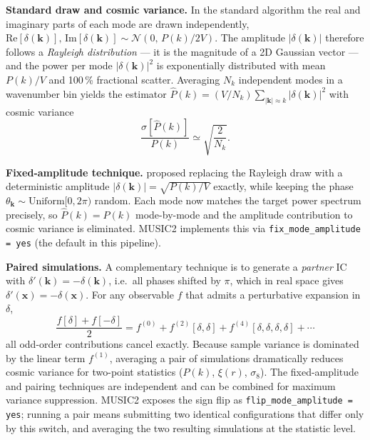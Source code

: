 \documentclass[12pt]{article}
\newcommand{\bx}{\mathbf{x}}
\newcommand{\bk}{\mathbf{k}}
\begin{document}
\begin{tcolorbox}[
  title={Fixed-amplitude (``paired-and-fixed'') ICs \citep{Angulo2016}},
  colback=gray!5,
  colframe=gray!55!black,
  coltitle=white,
  fonttitle=\bfseries,
  breakable,
  before skip=1.2em,
  after skip=1.2em
]

\textbf{Standard draw and cosmic variance.}
In the standard algorithm the real and imaginary parts of each mode are drawn
independently,
$\mathrm{Re}[\delta(\bk)],\,\mathrm{Im}[\delta(\bk)]
 \sim \mathcal{N}(0,\,P(k)/2V)$.
The amplitude $|\delta(\bk)|$ therefore follows a \emph{Rayleigh
distribution} — it is the magnitude of a 2D Gaussian vector — and the
power per mode $|\delta(\bk)|^2$ is exponentially distributed with mean
$P(k)/V$ and 100\,\% fractional scatter.
Averaging $N_k$ independent modes in a wavenumber bin yields the estimator
$\hat{P}(k) = (V/N_k)\sum_{|\bk|\approx k}|\delta(\bk)|^2$ with cosmic
variance
%
\begin{equation*}
  \frac{\sigma[\hat{P}(k)]}{P(k)} \simeq \sqrt{\frac{2}{N_k}}.
\end{equation*}

\textbf{Fixed-amplitude technique.}
\citet{Angulo2016} proposed replacing the Rayleigh draw with a deterministic
amplitude $|\delta(\bk)| = \sqrt{P(k)/V}$ exactly, while keeping the
phase $\theta_\bk \sim \mathrm{Uniform}[0,2\pi)$ random.
Each mode now matches the target power spectrum precisely, so
$\hat{P}(k) = P(k)$ mode-by-mode and the amplitude contribution to
cosmic variance is eliminated.
MUSIC2 implements this via \texttt{fix\_mode\_amplitude = yes}
(the default in this pipeline).

\textbf{Paired simulations.}
A complementary technique \citep{Pontzen2016} is to generate a
\emph{partner} IC with $\delta'(\bk) = -\delta(\bk)$, i.e.\ all phases
shifted by $\pi$, which in real space gives $\delta'(\bx) = -\delta(\bx)$.
For any observable $f$ that admits a perturbative expansion in $\delta$,
%
\begin{equation*}
  \frac{f[\delta]+f[-\delta]}{2}
  = f^{(0)} + f^{(2)}[\delta,\delta] + f^{(4)}[\delta,\delta,\delta,\delta]
  + \cdots
\end{equation*}
%
all odd-order contributions cancel exactly.
Because sample variance is dominated by the linear term $f^{(1)}$,
averaging a pair of simulations dramatically reduces cosmic variance
for two-point statistics ($P(k)$, $\xi(r)$, $\sigma_8$).
The fixed-amplitude and pairing techniques are independent and can be
combined for maximum variance suppression.
MUSIC2 exposes the sign flip as \texttt{flip\_mode\_amplitude = yes};
running a pair means submitting two identical configurations that differ
only by this switch, and averaging the two resulting simulations at the
statistic level.


\end{tcolorbox}
\end{document}
